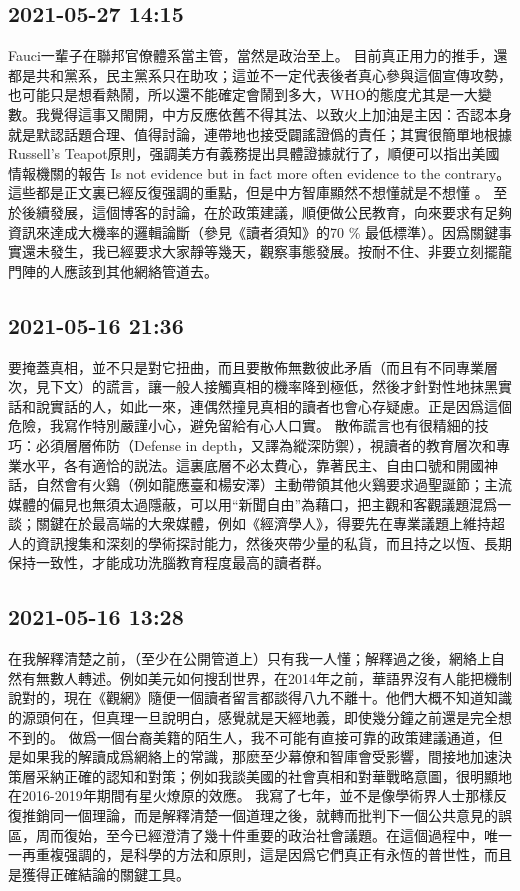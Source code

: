 \documentclass[twocolumn]{ctexart}
\begin{document}
\subsection*{2021-05-27 14:15}

Fauci一輩子在聯邦官僚體系當主管，當然是政治至上。
目前真正用力的推手，還都是共和黨系，民主黨系只在助攻；這並不一定代表後者真心參與這個宣傳攻勢，也可能只是想看熱鬧，所以還不能確定會鬧到多大，WHO的態度尤其是一大變數。我覺得這事又閙開，中方反應依舊不得其法、以致火上加油是主因：否認本身就是默認話題合理、值得討論，連帶地也接受闢謠證僞的責任；其實很簡單地根據Russell's Teapot原則，强調美方有義務提出具體證據就行了，順便可以指出美國情報機關的報告 Is not evidence but in fact more often evidence to the contrary。這些都是正文裏已經反復强調的重點，但是中方智庫顯然不想懂就是不想懂 。
至於後續發展，這個博客的討論，在於政策建議，順便做公民教育，向來要求有足夠資訊來達成大機率的邏輯論斷（參見《讀者須知》的70 \% 最低標準）。因爲關鍵事實還未發生，我已經要求大家靜等幾天，觀察事態發展。按耐不住、非要立刻擺龍門陣的人應該到其他網絡管道去。
\subsection*{2021-05-16 21:36}

要掩蓋真相，並不只是對它扭曲，而且要散佈無數彼此矛盾（而且有不同專業層次，見下文）的謊言，讓一般人接觸真相的機率降到極低，然後才針對性地抹黑實話和說實話的人，如此一來，連偶然撞見真相的讀者也會心存疑慮。正是因爲這個危險，我寫作特別嚴謹小心，避免留給有心人口實。
散佈謊言也有很精細的技巧：必須層層佈防（Defense in depth，又譯為縱深防禦），視讀者的教育層次和專業水平，各有適恰的説法。這裏底層不必太費心，靠著民主、自由口號和開國神話，自然會有火鷄（例如龍應臺和楊安澤）主動帶領其他火鷄要求過聖誕節；主流媒體的偏見也無須太過隱蔽，可以用“新聞自由”為藉口，把主觀和客觀議題混爲一談；關鍵在於最高端的大衆媒體，例如《經濟學人》，得要先在專業議題上維持超人的資訊搜集和深刻的學術探討能力，然後夾帶少量的私貨，而且持之以恆、長期保持一致性，才能成功洗腦教育程度最高的讀者群。
\subsection*{2021-05-16 13:28}

在我解釋清楚之前，（至少在公開管道上）只有我一人懂；解釋過之後，網絡上自然有無數人轉述。例如美元如何搜刮世界，在2014年之前，華語界沒有人能把機制說對的，現在《觀網》隨便一個讀者留言都談得八九不離十。他們大概不知道知識的源頭何在，但真理一旦說明白，感覺就是天經地義，即使幾分鐘之前還是完全想不到的。
做爲一個台裔美籍的陌生人，我不可能有直接可靠的政策建議通道，但是如果我的解讀成爲網絡上的常識，那麽至少幕僚和智庫會受影響，間接地加速決策層采納正確的認知和對策；例如我談美國的社會真相和對華戰略意圖，很明顯地在2016-2019年期間有星火燎原的效應。
我寫了七年，並不是像學術界人士那樣反復推銷同一個理論，而是解釋清楚一個道理之後，就轉而批判下一個公共意見的誤區，周而復始，至今已經澄清了幾十件重要的政治社會議題。在這個過程中，唯一一再重複强調的，是科學的方法和原則，這是因爲它們真正有永恆的普世性，而且是獲得正確結論的關鍵工具。
\end{document}
